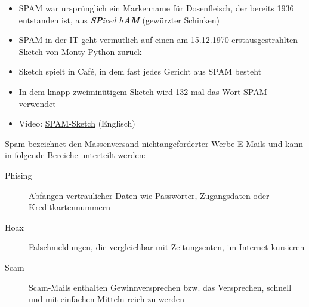 
\begin{frame}
\begin{itemize}
	\item SPAM war ursprünglich ein Markenname für Dosenfleisch, der bereits 1936 entstanden ist, aus \textit{\textbf{SP}iced h\textbf{AM}} (gewürzter Schinken)
	\item SPAM in der IT geht vermutlich auf einen am 15.12.1970 erstausgestrahlten Sketch von Monty Python zurück
	\item Sketch spielt in Café, in dem fast jedes Gericht aus SPAM besteht
	\item In dem knapp zweiminütigem Sketch wird 132-mal das Wort SPAM verwendet
	\item Video: \href{https://www.dailymotion.com/video/x2hwqlw}{SPAM-Sketch} (Englisch)
\end{itemize}
\end{frame}

\begin{frame}
Spam bezeichnet den Massenversand nichtangeforderter Werbe-E-Mails und kann in folgende Bereiche unterteilt werden:
\begin{description}
	\item[Phising] Abfangen vertraulicher Daten wie Passwörter, Zugangsdaten oder Kreditkartennummern
	\item[Hoax] Falschmeldungen, die vergleichbar mit Zeitungsenten, im Internet kursieren
	\item[Scam] Scam-Mails enthalten Gewinnversprechen bzw. das Versprechen, schnell und mit einfachen Mitteln reich zu werden
\end{description}
\end{frame}


